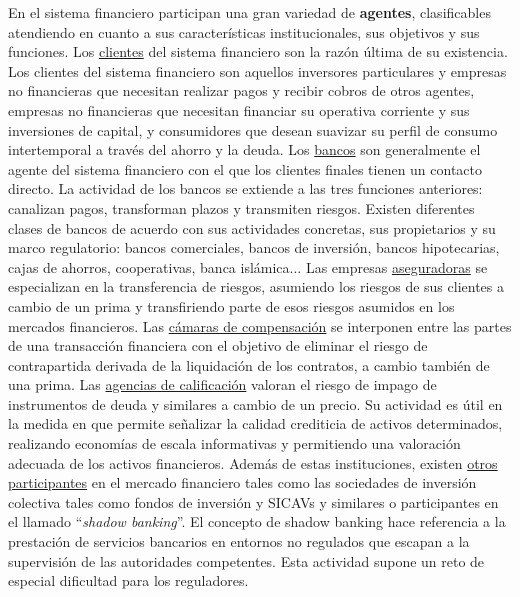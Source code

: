 \documentclass{nuevotema}
\begin{document}
En el sistema financiero participan una gran variedad de \textbf{agentes}, clasificables atendiendo en cuanto a sus características institucionales, sus objetivos y sus funciones. Los \underline{clientes} del sistema financiero son la razón última de su existencia. Los clientes del sistema financiero son aquellos inversores particulares y empresas no financieras que necesitan realizar pagos y recibir cobros de otros agentes, empresas no financieras que necesitan financiar su operativa corriente y sus inversiones de capital, y consumidores que desean suavizar su perfil de consumo intertemporal a través del ahorro y la deuda. Los \underline{bancos} son generalmente el agente del sistema financiero con el que los clientes finales tienen un contacto directo. La actividad de los bancos se extiende a las tres funciones anteriores: canalizan pagos, transforman plazos y transmiten riesgos. Existen diferentes clases de bancos de acuerdo con sus actividades concretas, sus propietarios y su marco regulatorio: bancos comerciales, bancos de inversión, bancos hipotecarias, cajas de ahorros, cooperativas, banca islámica... Las empresas \underline{aseguradoras} se especializan en la transferencia de riesgos, asumiendo los riesgos de sus clientes a cambio de un prima y transfiriendo parte de esos riesgos asumidos en los mercados financieros. Las \underline{cámaras de compensación} se interponen entre las partes de una transacción financiera con el objetivo de eliminar el riesgo de contrapartida derivada de la liquidación de los contratos, a cambio también de una prima. Las \underline{agencias de calificación} valoran el riesgo de impago de instrumentos de deuda y similares a cambio de un precio. Su actividad es útil en la medida en que permite señalizar la calidad crediticia de activos determinados, realizando economías de escala informativas y permitiendo una valoración adecuada de los activos financieros. Además de estas instituciones, existen \underline{otros participantes} en el mercado financiero tales como las sociedades de inversión colectiva tales como fondos de inversión y SICAVs y similares o participantes en el llamado ``\textit{shadow banking}''. El concepto de shadow banking hace referencia a la prestación de servicios bancarios en entornos no regulados que escapan a la supervisión de las autoridades competentes. Esta actividad supone un reto de especial dificultad para los reguladores. 
\end{document}
